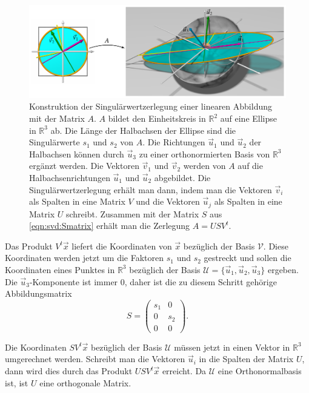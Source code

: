 \begin{figure}
\centering
\includegraphics[width=\textwidth]{7/images/svdmotivation.pdf}
\caption{
Konstruktion der Singulärwertzerlegung einer linearen Abbildung mit
der Matrix $A$.
$A$ bildet den Einheitskreis in $\mathbb{R}^2$ auf eine Ellipse
in $\mathbb{R}^3$ ab.
Die Länge der Halbachsen der Ellipse sind die Singulärwerte $s_1$ und $s_2$ 
von $A$.
Die Richtungen $\vec{u}_1$ und $\vec{u}_2$  der Halbachsen 
können durch $\vec{u}_3$ zu einer orthonormierten Basis von
$\mathbb{R}^3$ ergänzt werden.
Die Vektoren $\vec{v}_1$ und $\vec{v}_2$ werden von $A$ auf die
Halbachsenrichtungen $\vec{u}_1$ und $\vec{u}_2$ abgebildet.
Die Singulärwertzerlegung erhält man dann, indem man die Vektoren 
$\vec{v}_i$ als Spalten in eine Matrix $V$ und die Vektoren $\vec{u}_j$
als Spalten in eine Matrix $U$ schreibt.
Zusammen mit der Matrix $S$ aus \eqref{eqn:svd:Smatrix} erhält man
die Zerlegung $A=USV^t$.
\label{figure:svdmotivation}
}
\end{figure}

Das Produkt $V^t\vec{x}$ liefert die Koordinaten von $\vec{x}$
bezüglich der Basis $\mathcal{V}$.
Diese Koordinaten werden jetzt um die Faktoren $s_1$ und $s_2$ 
gestreckt und sollen die Koordinaten eines Punktes in $\mathbb{R}^3$
bezüglich der Basis $\mathcal{U}=\{\vec{u}_1,\vec{u}_2,\vec{u}_3\}$ ergeben.
Die $\vec{u}_3$-Komponente ist immer $0$, daher ist die zu diesem
Schritt gehörige Abbildungsmatrix
\begin{equation}
S=\begin{pmatrix}
s_1& 0 \\
 0 &s_2\\
 0 & 0
\end{pmatrix}.
\label{eqn:svd:Smatrix}
\end{equation}

Die Koordinaten $SV^t\vec{x}$ bezüglich der Basis $\mathcal{U}$
müssen jetzt in einen Vektor in $\mathbb{R}^3$ umgerechnet werden.
Schreibt man die Vektoren $\vec{u}_i$ in die Spalten der Matrix $U$,
dann wird dies durch das Produkt $USV^t\vec{x}$ erreicht.
Da $\mathcal{U}$ eine Orthonormalbasis ist, ist $U$ eine orthogonale
Matrix.


